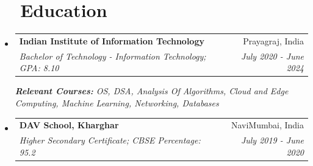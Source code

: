 \documentclass[a4paper,20pt]{article}
\makeatletter
\newcommand{\resumeSubheading}[4]{
  \vspace{-1pt}\item
    \begin{tabular*}{0.97\textwidth}{l@{\extracolsep{\fill}}r}
      \textbf{#1} & #2 \\
      \textit{#3} & \textit{#4} \\
    \end{tabular*}\vspace{-5pt}
}
\newcommand{\resumeSubHeadingListStart}{\begin{itemize}[leftmargin=*]}
\newcommand{\resumeSubHeadingListEnd}{\end{itemize}}
\makeatother
\begin{document}
\section{~~Education}
  \resumeSubHeadingListStart
    \resumeSubheading
      {Indian Institute of Information Technology}{Prayagraj, India}
      {Bachelor of Technology - Information Technology;  GPA: 8.10}{July 2020 - June 2024}
      {\scriptsize \textit{ \footnotesize{\newline{}\textbf{Relevant Courses:} OS, DSA, Analysis Of Algorithms, Cloud and Edge Computing, Machine Learning, Networking, Databases}}}
    \resumeSubHeadingListEnd
    \vspace{-15pt}
    \resumeSubHeadingListStart
    \resumeSubheading
      {DAV School, Kharghar}{NaviMumbai, India}
      {Higher Secondary Certificate;  CBSE Percentage: 95.2}{July 2019 - June 2020}
    \resumeSubHeadingListEnd
\vspace{-5pt}

\end{document}
